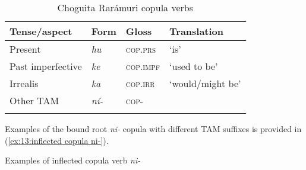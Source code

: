 \clearpage

\begin{table}
\caption{Choguita Rarámuri copula verbs}
\label{tab:key:25}
\begin{tabularx}{\textwidth}{XXXX}
\lsptoprule
\textbf{Tense/aspect} & \textbf{Form}  & \textbf{Gloss} & \textbf{Translation}\\
\midrule
Present & \textit{hu} & \textsc{cop.prs} & `is’\\
Past imperfective & \textit{ke} & \textsc{cop.impf} & `used to be’\\
Irrealis & \textit{ka} & \textsc{cop.irr} & `would/might be'\\
Other TAM  & \textit{ní-} & \textsc{cop-} & \\
\lspbottomrule
\end{tabularx}
\end{table}

Examples of the bound root \textit{ni-} copula with different TAM suffixes is provided in (\ref{ex:13:inflected copula ni-}).

\ea\label{ex:13:inflected copula ni-}
{Examples of inflected copula verb \textit{ni-}}

    \z
\z


